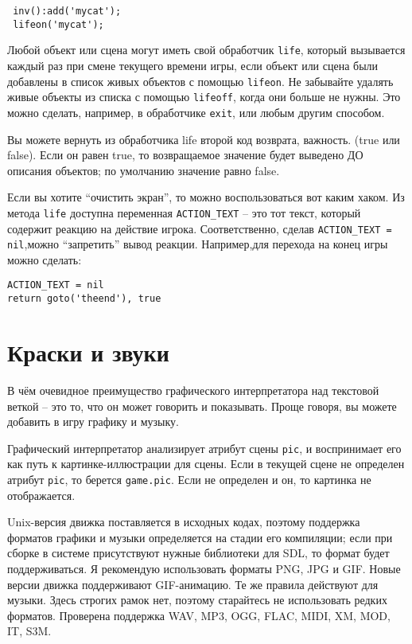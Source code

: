 \documentclass[a4paper,12pt]{article}
\begin{document}
\begin{verbatim}
 inv():add('mycat');
 lifeon('mycat');
\end{verbatim}

Любой объект или сцена могут иметь свой обработчик \verb/life/, который вызывается каждый раз при смене текущего времени игры, если объект или сцена были добавлены в список живых объектов с помощью \verb/lifeon/. Не забывайте удалять живые объекты из списка с помощью \verb/lifeoff/, когда они больше не нужны. Это можно сделать, например, в обработчике \verb/exit/, или любым другим способом.

Вы можете вернуть из обработчика life второй код возврата, важность. (true или false). Если он равен true, то возвращаемое значение будет выведено ДО описания объектов; по умолчанию значение равно false.

Если вы хотите ``очистить экран'', то можно воспользоваться вот каким хаком. Из метода \verb/life/ доступна переменная \verb/ACTION_TEXT/ -- это тот текст, который содержит реакцию на действие игрока. Соответственно, сделав \verb/ACTION_TEXT = nil/,можно ``запретить'' вывод реакции. Например,для перехода на конец игры можно сделать:

\begin{verbatim}
ACTION_TEXT = nil
return goto('theend'), true
\end{verbatim}

\section{Краски и звуки}

В чём очевидное преимущество графического интерпретатора над текстовой веткой -- это то, что он может говорить и показывать. Проще говоря, вы можете добавить в игру графику и музыку.

Графический интерпретатор анализирует атрибут сцены \verb/pic/, и воспринимает его как путь к картинке-иллюстрации для сцены. Если в текущей сцене не определен атрибут \verb/pic/, то берется \verb/game.pic/. Если не определен и он, то картинка не отображается.

Unix-версия движка поставляется в исходных кодах, поэтому поддержка форматов графики и музыки определяется на стадии его компиляции; если при сборке в системе присутствуют нужные библиотеки для SDL, то формат будет поддерживаться. Я рекомендую использовать форматы PNG, JPG и GIF. Новые версии движка поддерживают GIF-анимацию. Те же правила действуют для музыки. Здесь строгих рамок нет, поэтому старайтесь не использовать редких форматов. Проверена поддержка WAV, MP3, OGG, FLAC, MIDI, XM, MOD, IT, S3M.
\end{document}

